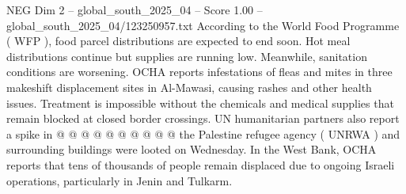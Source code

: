 \begin{textsample}{NEG Dim 2 – global\_south\_2025\_04 – Score 1.00 – global\_south\_2025\_04/123250957.txt}
According to the World Food Programme ( WFP ), food parcel distributions are expected to end soon.
Hot meal distributions continue but supplies are running low.
Meanwhile, sanitation conditions are worsening.
OCHA reports infestations of fleas and mites in three makeshift displacement sites in Al-Mawasi, causing rashes and other health issues.
Treatment is impossible without the chemicals and medical supplies that remain blocked at closed border crossings.
UN humanitarian partners also report a spike in @ @ @ @ @ @ @ @ @ @ the Palestine refugee agency ( UNRWA ) and surrounding buildings were looted on Wednesday.
In the West Bank, OCHA reports that tens of thousands of people remain displaced due to ongoing Israeli operations, particularly in Jenin and Tulkarm.

\end{textsample}
